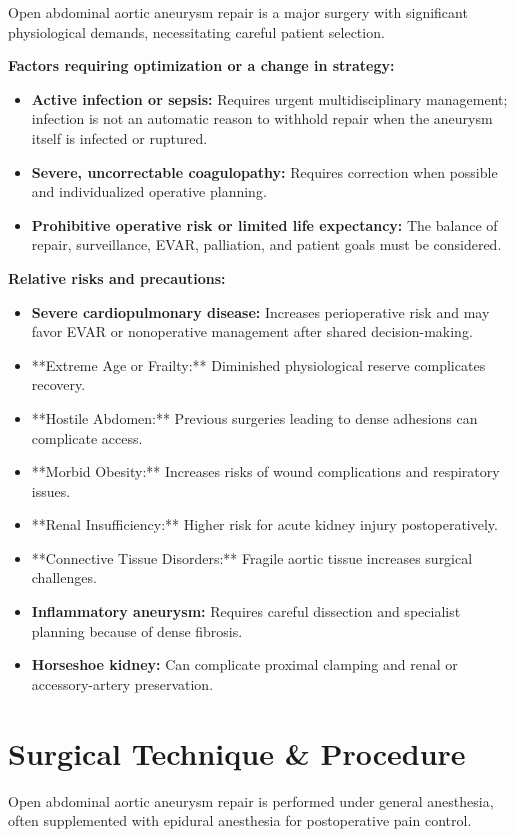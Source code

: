 Open abdominal aortic aneurysm repair is a major surgery with significant physiological demands, necessitating careful patient selection.

\textbf{Factors requiring optimization or a change in strategy:}
\begin{itemize}
  \item \textbf{Active infection or sepsis:} Requires urgent multidisciplinary management; infection is not an automatic reason to withhold repair when the aneurysm itself is infected or ruptured.
  \item \textbf{Severe, uncorrectable coagulopathy:} Requires correction when possible and individualized operative planning.
  \item \textbf{Prohibitive operative risk or limited life expectancy:} The balance of repair, surveillance, EVAR, palliation, and patient goals must be considered.
\end{itemize}

\textbf{Relative risks and precautions:}
\begin{itemize}
  \item \textbf{Severe cardiopulmonary disease:} Increases perioperative risk and may favor EVAR or nonoperative management after shared decision-making.
  \item **Extreme Age or Frailty:** Diminished physiological reserve complicates recovery.
  \item **Hostile Abdomen:** Previous surgeries leading to dense adhesions can complicate access.
  \item **Morbid Obesity:** Increases risks of wound complications and respiratory issues.
  \item **Renal Insufficiency:** Higher risk for acute kidney injury postoperatively.
  \item **Connective Tissue Disorders:** Fragile aortic tissue increases surgical challenges.
  \item \textbf{Inflammatory aneurysm:} Requires careful dissection and specialist planning because of dense fibrosis.
  \item \textbf{Horseshoe kidney:} Can complicate proximal clamping and renal or accessory-artery preservation.
\end{itemize}

\section*{Surgical Technique \& Procedure}
Open abdominal aortic aneurysm repair is performed under general anesthesia, often supplemented with epidural anesthesia for postoperative pain control.


